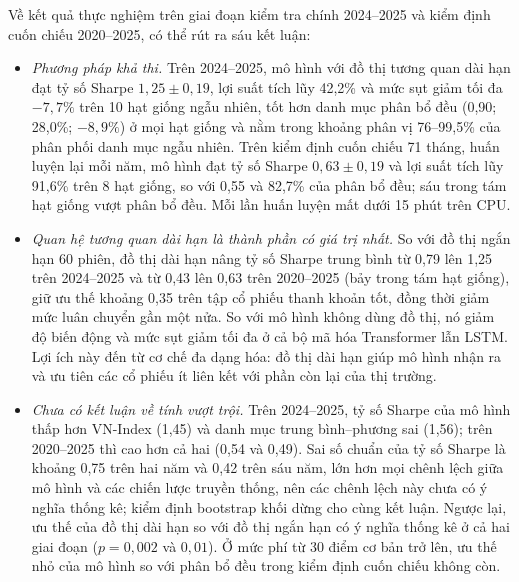 Về kết quả thực nghiệm trên giai đoạn kiểm tra chính 2024--2025 và kiểm định cuốn chiếu 2020--2025, có thể rút ra sáu kết luận:
\begin{itemize}
  \item \textit{Phương pháp khả thi.} Trên 2024--2025, mô hình với đồ thị tương quan dài hạn đạt tỷ số Sharpe $1{,}25\pm0{,}19$, lợi suất tích lũy 42,2\% và mức sụt giảm tối đa $-7{,}7\%$ trên 10 hạt giống ngẫu nhiên, tốt hơn danh mục phân bổ đều (0,90; 28,0\%; $-8{,}9\%$) ở mọi hạt giống và nằm trong khoảng phân vị 76--99,5\% của phân phối danh mục ngẫu nhiên. Trên kiểm định cuốn chiếu 71 tháng, huấn luyện lại mỗi năm, mô hình đạt tỷ số Sharpe $0{,}63\pm0{,}19$ và lợi suất tích lũy 91,6\% trên 8 hạt giống, so với 0,55 và 82,7\% của phân bổ đều; sáu trong tám hạt giống vượt phân bổ đều. Mỗi lần huấn luyện mất dưới 15 phút trên CPU.
  \item \textit{Quan hệ tương quan dài hạn là thành phần có giá trị nhất.} So với đồ thị ngắn hạn 60 phiên, đồ thị dài hạn nâng tỷ số Sharpe trung bình từ 0,79 lên 1,25 trên 2024--2025 và từ 0,43 lên 0,63 trên 2020--2025 (bảy trong tám hạt giống), giữ ưu thế khoảng 0,35 trên tập cổ phiếu thanh khoản tốt, đồng thời giảm mức luân chuyển gần một nửa. So với mô hình không dùng đồ thị, nó giảm độ biến động và mức sụt giảm tối đa ở cả bộ mã hóa Transformer lẫn LSTM. Lợi ích này đến từ cơ chế đa dạng hóa: đồ thị dài hạn giúp mô hình nhận ra và ưu tiên các cổ phiếu ít liên kết với phần còn lại của thị trường.
  \item \textit{Chưa có kết luận về tính vượt trội.} Trên 2024--2025, tỷ số Sharpe của mô hình thấp hơn VN-Index (1,45) và danh mục trung bình--phương sai (1,56); trên 2020--2025 thì cao hơn cả hai (0,54 và 0,49). Sai số chuẩn của tỷ số Sharpe là khoảng 0,75 trên hai năm và 0,42 trên sáu năm, lớn hơn mọi chênh lệch giữa mô hình và các chiến lược truyền thống, nên các chênh lệch này chưa có ý nghĩa thống kê; kiểm định bootstrap khối dừng cho cùng kết luận. Ngược lại, ưu thế của đồ thị dài hạn so với đồ thị ngắn hạn có ý nghĩa thống kê ở cả hai giai đoạn ($p = 0{,}002$ và $0{,}01$). Ở mức phí từ 30 điểm cơ bản trở lên, ưu thế nhỏ của mô hình so với phân bổ đều trong kiểm định cuốn chiếu không còn.

\end{itemize}

